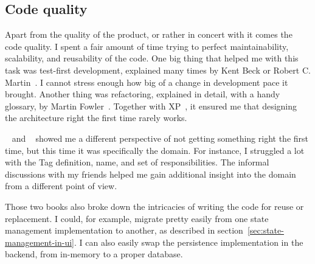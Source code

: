 \subsection{Code quality}\label{sec:code-quality}

Apart from the quality of the product,
or rather in concert with it
comes the code quality.
I spent a fair amount of time trying
to perfect maintainability,
scalability,
and reusability of the code.
One big thing that helped me with this task
was test-first development,
explained many times by Kent Beck or
Robert C. Martin~\cite{beck_extreme_2004,beck_test-driven_2002,martin_clean_2011}.
I cannot stress enough how big
of a change in development pace it brought.
Another thing was refactoring,
explained in detail,
with a handy glossary,
by Martin Fowler~\cite{fowler_refactoring_2019}.
Together with XP~\cite{beck_extreme_2004},
it ensured me that designing the architecture right
the first time rarely works.

~\cite{millett_patterns_2015}
and ~\cite{evans_domain-driven_2003}
showed me a different perspective
of not getting something right the first time,
but this time it was specifically the domain.
For instance,
I struggled a lot with the Tag definition,
name, and set of responsibilities.
The informal discussions with my friends
helped me gain additional insight into the domain
from a different point of view.

Those two books also broke down the intricacies
of writing the code for reuse or replacement.
I could, for example,
migrate pretty easily
from one state management implementation to another,
as described in section~\ref{sec:state-management-in-ui}.
I can also easily swap
the persistence implementation in the backend,
from in-memory to a proper database.
